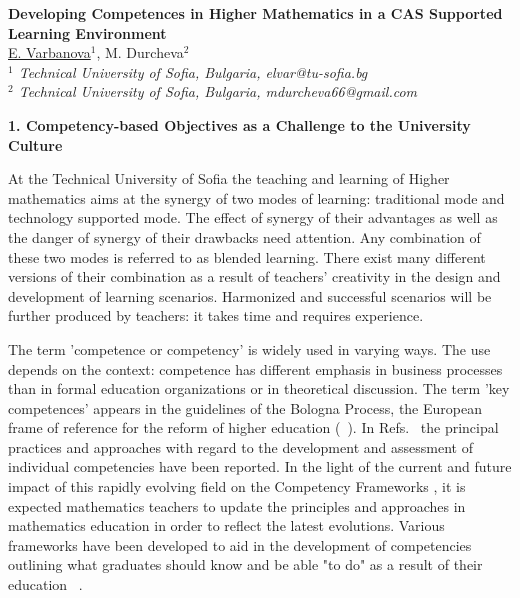\documentclass[11pt]{article}
\begin{document}
%
\vspace{-0.8cm}
\begin{flushleft}
\Large \textbf{\noindent
Developing Competences in Higher Mathematics
in a CAS Supported Learning Environment
}
\\
\vspace{0.5cm}
\normalsize
\normalsize{
 \underline{E. Varbanova}$^1$, M. Durcheva$^2$
} \\
\vspace{5mm}
\textit{\footnotesize
$^1$ Technical University of Sofia, Bulgaria,
elvar@tu-sofia.bg\\
$^2$ Technical University of Sofia, Bulgaria,
mdurcheva66@gmail.com\\
}
\end{flushleft}

\vspace{5mm}

\textbf{1.	Competency-based Objectives as a Challenge to the University Culture}

\vspace{5mm}

At the Technical University of Sofia the teaching and learning of Higher mathematics aims at the synergy of two modes of learning: traditional mode and technology supported mode. The effect of synergy of their advantages as well as the danger of synergy of their drawbacks need attention. Any combination of these two modes is referred to as blended learning. There exist many different versions of their combination as a result of teachers' creativity in the design and development of learning scenarios. Harmonized and successful scenarios will be further produced by teachers: it takes time and requires experience.


The term 'competence or competency' is widely used in varying ways. The use depends on the context: competence has different emphasis in business processes than in formal education organizations or in theoretical discussion. The term 'key competences' appears in the guidelines of the Bologna Process, the European frame of reference for the reform of higher education (~\cite{CHUR1, CHUR2}). In Refs.~\cite{TRACE} the principal practices and approaches with regard to the development and assessment of individual competencies have been reported.  In the light of the current and future impact of this rapidly evolving field on the Competency Frameworks , it is expected mathematics teachers to update the principles and approaches in mathematics education in order to reflect the latest evolutions. Various frameworks have been developed to aid in the development of competencies outlining what graduates should know and be able "to do" as a result of their education ~\cite{FORD}.
\end{document}
